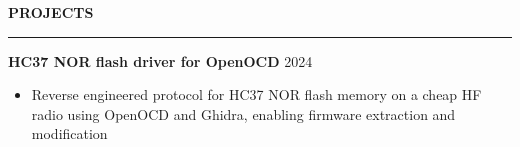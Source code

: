 \documentclass[notitlepage,10pt,a4paper]{article}
\newenvironment{resumesection}[1]{
    \header{#1}
}{}
\newcommand{\header}[1]{
    \vspace{2pt}
    \textcolor{accent1}{\Large \textbf{#1}}
    \vspace{6pt}\hrule\vspace{4pt}
}
\newcommand{\TECH}{
    \textcolor{accent3}{\small\textbf{SKILLS}}\small\,
}
\newcommand{\thingsep}{
    \vspace{4pt}
}
\begin{document}
\begin{resumesection}{PROJECTS}

    \raggedright
    \textcolor{accent2}{\textbf{\large HC37 NOR flash driver for OpenOCD}} \hfill {2024} \\
    {\small\begin{itemize}[noitemsep, font=\small, label={-}, leftmargin=*, topsep=0pt, partopsep=0pt]
        \item Reverse engineered protocol for HC37 NOR flash memory on a cheap HF radio using OpenOCD and Ghidra, enabling firmware extraction and modification
    \end{itemize}}
    \thingsep

    


\end{resumesection}
\end{document}
